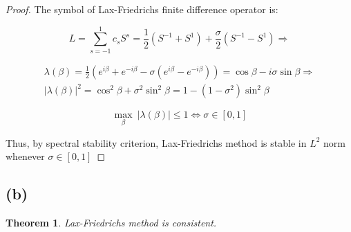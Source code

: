 \documentclass[a4paper]{amsproc}
\theoremstyle{plain}
\newtheorem*{thm}{Theorem}
\theoremstyle{definition}
\theoremstyle{remark}
\numberwithin{equation}{section}
\renewcommand{\le}{\leqslant}\renewcommand{\leq}{\leqslant}
\begin{document}
\begin{proof}
The symbol of Lax-Friedrichs finite difference operator is:

 $$ L = \sum\limits_{s=-1}^{1} c_s S^s = \frac{1}{2} (S^{-1} + S^1) + \frac{\sigma}{2}(S^{-1} - S^1) \Longrightarrow $$ 

 \begin{multline}
  \lambda(\beta) = \frac{1}{2}(e^{i\beta} + e^{-i\beta} - \sigma(e^{i\beta} - e^{-i\beta})) = \cos\beta - i\sigma\sin\beta \Longrightarrow \\
  \lvert \lambda(\beta) \rvert^2 = \cos^2\beta + \sigma^2\sin^2\beta = 1 - (1-\sigma^2)\sin^2\beta
 \end{multline}
 
 $$ \max_\beta ~\lvert \lambda(\beta) \rvert \le 1 \Longleftrightarrow \sigma \in [0,1]$$
 
 Thus, by spectral stability criterion, Lax-Friedrichs method is stable in $L^2$ norm whenever $\sigma \in [0,1]$
 
\end{proof}

\subsection*{(b)}

\begin{thm} 
Lax-Friedrichs method is consistent.
\end{thm}
\end{document}
